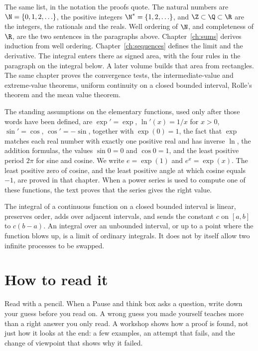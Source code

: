 \begin{remark}\label{sym:numbers}
The same list, in the notation the proofs quote. The natural numbers are $\N=\{0,1,2,\ldots\}$, the positive integers $\N^*=\{1,2,\ldots\}$, and $\Z\subset\Q\subset\R$ are the integers, the rationals and the reals. Well ordering of $\N$, and completeness of $\R$, are the two sentences in the paragraphs above. Chapter~\ref{ch:sums} derives induction from well ordering. Chapter~\ref{ch:sequences} defines the limit and the derivative. The integral enters there as signed area, with the four rules in the paragraph on the integral below. A later volume builds that area from rectangles. The same chapter proves the convergence tests, the intermediate-value and extreme-value theorems, uniform continuity on a closed bounded interval, Rolle's theorem and the mean value theorem.

The standing assumptions on the elementary functions, used only after those words have been defined, are $\exp'=\exp$, $\ln'(x)=1/x$ for $x>0$, $\sin'=\cos$, $\cos'=-\sin$, together with $\exp(0)=1$, the fact that $\exp$ matches each real number with exactly one positive real and has inverse $\ln$, the addition formulas, the values $\sin 0=0$ and $\cos 0=1$, and the least positive period $2\pi$ for sine and cosine. We write $e=\exp(1)$ and $e^x=\exp(x)$. The least positive zero of cosine, and the least positive angle at which cosine equals $-1$, are proved in that chapter. When a power series is used to compute one of these functions, the text proves that the series gives the right value.

The integral of a continuous function on a closed bounded interval is linear, preserves order, adds over adjacent intervals, and sends the constant $c$ on $[a,b]$ to $c(b-a)$. An integral over an unbounded interval, or up to a point where the function blows up, is a limit of ordinary integrals. It does not by itself allow two infinite processes to be swapped.
\end{remark}

\section*{How to read it}
Read with a pencil. When a Pause and think box asks a question, write down your guess before you read on. A wrong guess you made yourself teaches more than a right answer you only read. A workshop shows how a proof is found, not just how it looks at the end: a few examples, an attempt that fails, and the change of viewpoint that shows why it failed.


